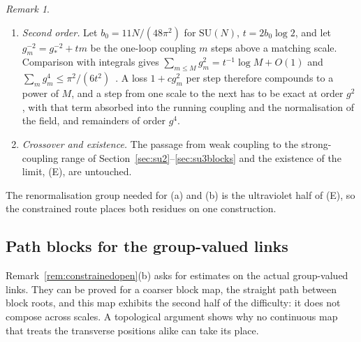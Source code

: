 \documentclass[11pt]{amsart}
\theoremstyle{definition}
\theoremstyle{remark}
\newtheorem{remark}[theorem]{Remark}
\numberwithin{equation}{section}
\newcommand{\SU}{\mathrm{SU}}
\begin{document}
\begin{remark}
\begin{enumerate}[label=\textup{(\alph*)},leftmargin=*]
the Hessian of the action along the fibre is at least $\lambda(\frac1{26}-
c_G\kappa)$ at every background with plaquettes at most $\kappa$
(Theorem~\ref{thm:smallfibre}), and on a convex chart of the fibre the
constrained law satisfies a Brascamp--Lieb inequality for large $\lambda$
(Theorem~\ref{thm:fibrechart}), and on a product chart its covariances
decay exponentially (Theorem~\ref{thm:chartdecay}), and the mass off
that chart is small on most fibres of the $\SU(2)$ Wilson measure
(Theorem~\ref{thm:offchart}) and on every fibre through a field with small
plaquettes (Corollary~\ref{cor:calmfibres}), and on every fibre the law
concentrates near the least action of its regular fields
(Proposition~\ref{prop:everyfibre}); the remaining
small-field steps are listed in Remark~\ref{rem:chartdecayopen}.
\item \emph{Second order.} Let $b_0=11N/(48\pi^2)$ for $\SU(N)$, $t=2b_0\log2$,
and let $g_m^{-2}=g_*^{-2}+tm$ be the one-loop coupling $m$ steps above a
matching scale. Comparison with integrals gives $\sum_{m\le M}g_m^2=
t^{-1}\log M+O(1)$ and $\sum_mg_m^4\le\pi^2/(6t^2)$~\cite{Loc26}. A loss $1+cg_m^2$ per step therefore
compounds to a power of $M$, and a step from one scale to the next has to be
exact at order $g^2$, with that term absorbed into the running coupling and
the normalisation of the field, and remainders of order $g^4$.
\item \emph{Crossover and existence.} The passage from weak coupling to the
strong-coupling range of Section~\ref{sec:su2}--\ref{sec:su3blocks} and the
existence of the limit, (E), are untouched.
\end{enumerate}
The renormalisation group needed for (a) and (b) is the ultraviolet half of
(E), so the constrained route places both residues on one construction.
\end{remark}

\subsection{Path blocks for the group-valued links}\label{ssec:pathblocks}

Remark~\ref{rem:constrainedopen}(b) asks for estimates on the actual
group-valued links. They can be proved for a coarser block map, the
straight path between block roots, and this map exhibits the second half of
the difficulty: it does not compose across scales. A topological argument
shows why no continuous map that treats the transverse positions alike can
take its place.
\end{document}
